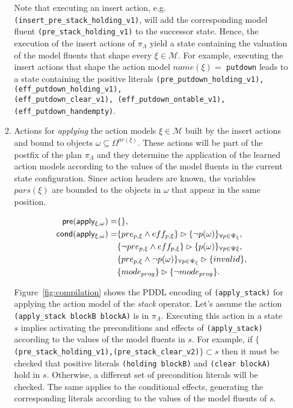 \documentclass[runningheads]{llncs}
\newcommand{\pre}{\mathsf{pre}}     %
\newcommand{\cond}{\mathsf{cond}}   %
\begin{document}
\begin{itemize}
\begin{enumerate}
Note that executing an insert action, e.g.{\tt{\small (insert\_pre\_stack\_holding\_v1)}}, will add the corresponding model fluent {\tt{\small (pre\_stack\_holding\_v1)}} to the successor state. Hence, the execution of the insert actions of $\pi_\Lambda$ yield a state containing the valuation of the model fluents that shape every $\xi \in \mathcal{M}$. For example, executing the insert actions that shape the action model $name(\xi)=$ {\tt{\small putdown}} leads to a state containing the positive literals {\tt{\small (pre\_putdown\_holding\_v1),(eff\_putdown\_holding\_v1),\\ (eff\_putdown\_clear\_v1),
(eff\_putdown\_ontable\_v1),(eff\_putdown\_handempty)}}.

\item Actions for {\em applying} the action models $\xi\in\mathcal{M}$ built by the insert actions and bound to objects $\omega\subseteq\Omega^{ar(\xi)}$. These actions will be part of the postfix of the plan $\pi_\Lambda$ and they determine the application of the learned action models according to the values of the model fluents in the current state configuration. Since action headers are known, the variables $pars(\xi)$ are bounded to the objects in $\omega$ that appear in the same position.

\begin{small}
\begin{align*}
\hspace*{7pt}\pre(\mathsf{apply_{\xi,\omega}})=&\{\},\\
\cond(\mathsf{apply_{\xi,\omega}})=& \{pre_{p,\xi}\wedge eff_{p,\xi}\}\rhd\{\neg p(\omega)\}_{\forall p\in\Psi_\xi},\\
& \{\neg pre_{p,\xi}\wedge eff_{p,\xi}\}\rhd\{p(\omega)\}_{\forall p\in\Psi\xi},\\
& \{pre_{p,\xi}\wedge \neg p(\omega)\}_{\forall p\in\Psi_\xi}\rhd\{invalid\},\\
&\{mode_{prog}\}\rhd\{\neg mode_{prog}\}.
\end{align*}
\end{small}

Figure~\ref{fig:compilation} shows the PDDL encoding of {\tt{\small (apply\_stack)}} for applying the action model of the {\em stack} operator. Let's assume the action {\tt{\small (apply\_stack blockB blockA)}} is in $\pi_\Lambda$. Executing this action in a state $s$ implies activating the preconditions and effects of {\tt{\small (apply\_stack)}} according to the values of the model fluents in $s$. For example, if  $\{${\tt{\small (pre\_stack\_holding\_v1),(pre\_stack\_clear\_v2)}}$\} \subset s$ then it must be checked that positive literals {\tt{\small (holding blockB)}} and {\tt{\small (clear blockA)}} hold in $s$. Otherwise, a different set of precondition literals will be checked. The same applies to the conditional effects, generating the corresponding literals according to the values of the model fluents of $s$.


\end{enumerate}
\end{itemize}
\end{document}
